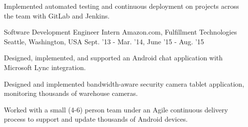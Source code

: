 \begin{cventries}
{\begin{cvitems}
            \item Implemented automated testing and continuous deployment on projects across the team with GitLab and Jenkins.
        \end{cvitems}
    }
\vspace{3mm}
\cventry
    {Software Development Engineer Intern} %
    {Amazon.com, Fulfillment Technologies} %
    {Seattle, Washington, USA} %
    {Sept. '13 - Mar. '14,
    June '15 - Aug. '15} %
    {
        \begin{cvitems}
            \item Designed, implemented, and supported an Android chat application with Microsoft Lync integration.
            \item Designed and implemented bandwidth-aware security camera tablet application, monitoring thousands of warehouse cameras.
            \item Worked with a small (4-6) person team under an Agile continuous delivery process to support and update thousands of Android devices.
        \end{cvitems}
    }
\end{cventries}

